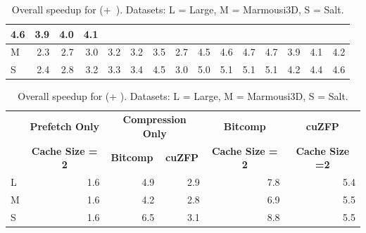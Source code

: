 \documentclass[Ingles]{ic-tese-v3}
\begin{document}
\begin{table}[h!]
\begin{tabular}{|l|rrrrr|rr|rrrr|rrr|}
  4.6 &
  \multicolumn{1}{r|}{3.9} &
  \multicolumn{1}{r|}{4.0} &
  4.1 \\ \hline
\cellcolor[HTML]{C0C0C0}M &
  \multicolumn{1}{r|}{2.3} &
  \multicolumn{1}{r|}{2.7} &
  \multicolumn{1}{r|}{3.0} &
  \multicolumn{1}{r|}{3.2} &
  3.2 &
  \multicolumn{1}{r|}{3.5} &
  2.7 &
  \multicolumn{1}{r|}{4.5} &
  \multicolumn{1}{r|}{4.6} &
  \multicolumn{1}{r|}{4.7} &
  4.7 &
  \multicolumn{1}{r|}{3.9} &
  \multicolumn{1}{r|}{4.1} &
  4.2 \\ \hline
\rowcolor[HTML]{F2F2F2}\cellcolor[HTML]{C0C0C0}S &
  \multicolumn{1}{r|}{2.4} &
  \multicolumn{1}{r|}{2.8} &
  \multicolumn{1}{r|}{3.2} &
  \multicolumn{1}{r|}{3.3} &
  3.4 &
  \multicolumn{1}{r|}{4.5} &
  3.0 &
  \multicolumn{1}{r|}{5.0} &
  \multicolumn{1}{r|}{5.1} &
  \multicolumn{1}{r|}{5.1} &
  5.1 &
  \multicolumn{1}{r|}{4.2} &
  \multicolumn{1}{r|}{4.4} &
  4.6 \\ \hline
\end{tabular}
\caption[Overall speedup for \revolve (\checkpointprefetching +~\compression)]{Overall speedup for \revolve (\checkpointprefetching +~\compression). Datasets: L = Large, M = Marmousi3D, S = Salt.}
\label{tab:gpuzip_revolve_speedup}
\end{table}


\begin{table}[h!]
\centering
\begin{tabular}{|l|r|rr|r|r|}
\hline
\rowcolor[HTML]{C0C0C0} 
\multicolumn{1}{|c|}{\cellcolor[HTML]{C0C0C0}} &
  \multicolumn{1}{c|}{\cellcolor[HTML]{C0C0C0}\textbf{Prefetch Only}} &
  \multicolumn{2}{c|}{\cellcolor[HTML]{C0C0C0}\textbf{Compression Only}} &
  \multicolumn{1}{c|}{\cellcolor[HTML]{C0C0C0}\textbf{Bitcomp}} &
  \multicolumn{1}{c|}{\cellcolor[HTML]{C0C0C0}\textbf{cuZFP}} \\ \cline{2-6} 
\rowcolor[HTML]{C0C0C0} 
\multicolumn{1}{|c|}{\multirow{-2}{*}{\cellcolor[HTML]{C0C0C0}\textbf{}}} &
  \multicolumn{1}{c|}{\cellcolor[HTML]{C0C0C0}\textbf{Cache Size = 2}} &
  \multicolumn{1}{c|}{\cellcolor[HTML]{C0C0C0}\textbf{Bitcomp}} &
  \multicolumn{1}{c|}{\cellcolor[HTML]{C0C0C0}\textbf{cuZFP}} &
  \multicolumn{1}{c|}{\cellcolor[HTML]{C0C0C0}\textbf{Cache Size = 2}} &
  \multicolumn{1}{c|}{\cellcolor[HTML]{C0C0C0}\textbf{Cache Size =2}} \\ \hline
\rowcolor[HTML]{EFEFEF} 
\cellcolor[HTML]{C0C0C0}L & 1.6 & \multicolumn{1}{r|}{\cellcolor[HTML]{EFEFEF}4.9} & 2.9 & 7.8 & 5.4 \\ \hline
\cellcolor[HTML]{C0C0C0}M & 1.6 & \multicolumn{1}{r|}{4.2}                         & 2.8 & 6.9 & 5.5 \\ \hline
\rowcolor[HTML]{EFEFEF} 
\cellcolor[HTML]{C0C0C0}S & 1.6 & \multicolumn{1}{r|}{\cellcolor[HTML]{EFEFEF}6.5} & 3.1 & 8.8 & 5.5 \\ \hline
\end{tabular}
\caption[Overall speedup for \zcut (\checkpointprefetching + \compression)]{Overall speedup for \zcut (\checkpointprefetching + \compression). Datasets: L = Large, M = Marmousi3D, S = Salt. }
\label{tab:gpuzip_zcut_speedup}
\end{table}
\end{document}
